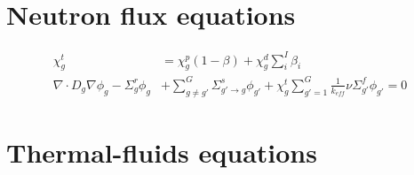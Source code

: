 
\section{Neutron flux equations}
\label{appendix:equations-n}


\begin{align}
  \chi_g^t &= \chi_g^p (1 - \beta) + \chi_g^d \sum_i^I \beta_i  \label{eq:chit} \\
  \nabla \cdot D_g \nabla \phi_g - \Sigma_g^r \phi_g & + \sum_{g \ne g'}^G \Sigma_{g'\rightarrow g}^s \phi_{g'} +
  \chi_g^t \sum_{g' = 1}^G \frac{1}{k_{eff}}\nu \Sigma_{g'}^f \phi_{g'} = 0 \label{eq:eigenvalue}
\end{align}

\section{Thermal-fluids equations}
\label{appendix:equations-th}




